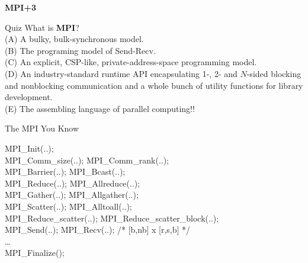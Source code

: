 \documentclass[11pt]{beamer}
\begin{document}
\begin{frame}{} \LARGE
  \begin{center}
      \textbf{MPI+3}
  \end{center}
\end{frame}

\begin{frame}{Quiz} \Large
    What is \textbf{MPI}? \\
    (A) A bulky, bulk-synchronous model. \\
    (B) The programing model of Send-Recv. \\
    (C) An explicit, CSP-like, private-address-space programming model. \\
    (D) An industry-standard runtime API encapsulating
        1-, 2- and $N$-sided blocking and nonblocking communication
        and a whole bunch of utility functions for library development. \\
    (E) The assembling language of parallel computing!!
\end{frame}

\begin{frame}{The MPI You Know}
    \begin{tt}
        MPI\_Init(..); \\
        MPI\_Comm\_size(..); MPI\_Comm\_rank(..); \\
        MPI\_Barrier(..); MPI\_Bcast(..); \\
        MPI\_Reduce(..); MPI\_Allreduce(..); \\
        MPI\_Gather(..); MPI\_Allgather(..); \\
        MPI\_Scatter(..); MPI\_Alltoall(..); \\
        MPI\_Reduce\_scatter(..); MPI\_Reduce\_scatter\_block(..); \\
        MPI\_Send(..); MPI\_Recv(..); /* [b,nb] x [r,s,b] */ \\
        \ldots \\
        MPI\_Finalize();
    \end{tt}
\end{frame}

\end{document}
